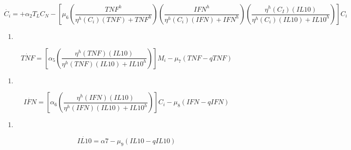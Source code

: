 \documentclass[
]{article}
\providecommand{\tightlist}{%
  \setlength{\itemsep}{0pt}\setlength{\parskip}{0pt}}
\begin{document}
\[ \dot{C_{i}}= +\alpha_{2}T_{L}C_{N}- [\mu_{6}(\dfrac{TNF^{h}}{\eta^{h}(C_{i})(TNF)+TNF^{h}})(\dfrac{IFN^{h}}{\eta^{h}(C_{i})(IFN)+IFN^{h}})(\dfrac{\eta^{h}(C_{I})(IL10)}{\eta^{h}(C_{i})(IL10)+IL10^{h}})]C_{i} \]

\begin{enumerate}
\def\labelenumi{\arabic{enumi}.}
\setcounter{enumi}{6}
\tightlist
\item
\end{enumerate}

\[\dot{TNF}= [\alpha_{5}(\dfrac{\eta^{h}(TNF)(IL10)}{\eta^{h}(TNF)(IL10)+IL10^{h}})]M_{i} -\mu_{7}(TNF -qTNF)\]

\begin{enumerate}
\def\labelenumi{\arabic{enumi}.}
\setcounter{enumi}{7}
\tightlist
\item
\end{enumerate}

\[ \dot{IFN}=  [\alpha_{6}(\dfrac{\eta^{h}(IFN)(IL10)}{\eta^{h}(IFN)(IL10)+IL10^{h}})]C_{i}-\mu_{8}(IFN-qIFN) \]

\begin{enumerate}
\def\labelenumi{\arabic{enumi}.}
\setcounter{enumi}{8}
\tightlist
\item
\end{enumerate}

\[ \dot{IL10}= \alpha{7}-\mu_{9}(IL10-qIL10) \]
\end{document}
